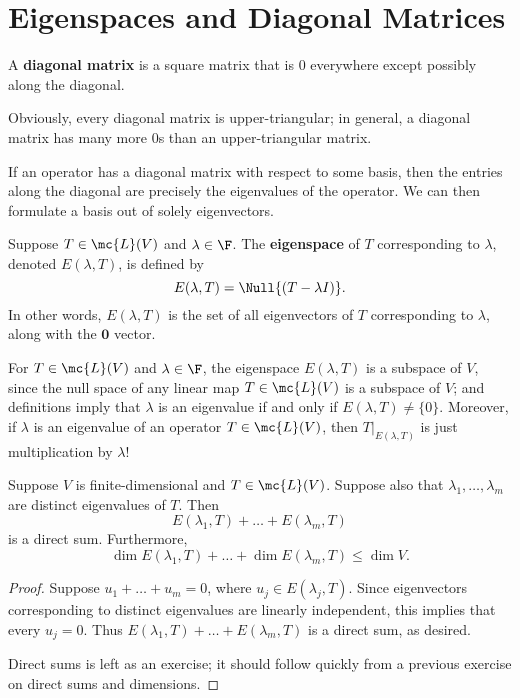 \documentclass[math0540-lecture-notes.tex]{subfiles}
\begin{document}
\section{Eigenspaces and Diagonal Matrices}
\begin{definition}{}
  A \textbf{diagonal matrix} is a square matrix that is $0$ everywhere except possibly along the
  diagonal.
\end{definition}

Obviously, every diagonal matrix is upper-triangular; in general, a diagonal matrix has many more
$0$s than an upper-triangular matrix.

If an operator has a diagonal matrix with respect to some basis, then the entries along the diagonal
are precisely the eigenvalues of the operator. We can then formulate a basis out of solely
eigenvectors.
\begin{definition}[Eigenspace]{}
  Suppose $T\in \mc{L}(V)$ and $\lambda\in \F$. The \textbf{eigenspace} of $T$ corresponding to
  $\lambda$, denoted $E(\lambda,T)$, is defined by \[
    E(\lambda,T)=\Null{(T-\lambda I)}
  .\] In other words, $E(\lambda, T)$ is the set of all eigenvectors of $T$ corresponding to
  $\lambda$, along with the $\textbf{0}$ vector.
\end{definition}

For $T\in \mc{L}(V)$ and $\lambda\in \F$, the eigenspace $E(\lambda, T)$ is a subspace of $V$, since
the null space of any linear map $T\in \mc{L}(V)$ is a subspace of $V$; and definitions imply that
$\lambda$ is an eigenvalue if and only if $E(\lambda, T)\neq \{ 0 \}$. Moreover, if $\lambda$ is an
eigenvalue of an operator $T\in \mc{L}(V)$, then $T|_{E(\lambda,T)}$ is just multiplication by
$\lambda$!


\begin{proposition}{}
  Suppose $V$ is finite-dimensional and $T\in \mc{L}(V)$. Suppose also that
  $\lambda_1,\ldots,\lambda_m$ are distinct eigenvalues of $T$. Then \[
    E(\lambda_1,T)+\ldots+E(\lambda_m,T)
  \] is a direct sum. Furthermore, \[
    \dim{E(\lambda_1,T)}+\ldots+\dim{E(\lambda_m,T)}\le \dim{V}
  .\]
\end{proposition}
\begin{proof}[Proof]
  Suppose $u_1+\ldots+u_m=0$, where $u_j\in E(\lambda_j, T)$. Since eigenvectors corresponding to
  distinct eigenvalues are linearly independent, this implies that every $u_j=0$. Thus
  $E(\lambda_1,T)+\ldots+E(\lambda_m,T)$ is a direct sum, as desired.

  Direct sums is left as an exercise; it should follow quickly from a previous exercise on direct
  sums and dimensions.  
\end{proof}
\end{document}
